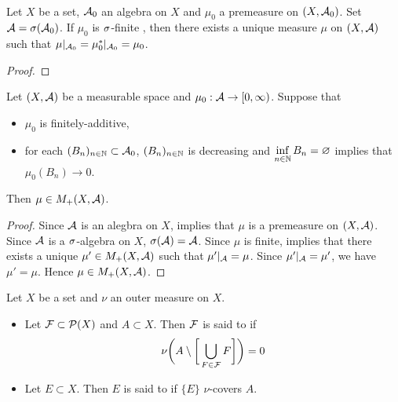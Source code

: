 \documentclass{book}
\begin{document}
	\begin{thm}   \\
		Let $X$ be a set, $\mathcal{A}_0$ an algebra on $X$ and $\mu_0$ a premeasure on $(X,\mathcal{A}_0)$. Set $\mathcal{A} = \sigma(\mathcal{A}_0)$. If $\mu_0$ is $\sigma$-finite , then there exists a unique measure $\mu$ on $(X, \mathcal{A})$ such that $\mu|_{\mathcal{A}_0} = \mu_0^*|_{\mathcal{A}_0} = \mu_0$. 
	\end{thm}

	\begin{proof}
	\end{proof}
	
	\begin{ex} 
		Let $(X, \mathcal{A})$ be a measurable space and $\mu_0:\mathcal{A} \rightarrow [0,\infty)$. Suppose that
		\begin{itemize}
			\item $\mu_0$ is finitely-additive,
			\item for each $(B_n)_{n \in \mathbb{N}} \subset \mathcal{A}_0$, $(B_n)_{n \in \mathbb{N}} $ is decreasing and $\inf\limits_{n \in \mathbb{N}} B_n = \varnothing$ implies that $\mu_0(B_n) \rightarrow 0$.
		\end{itemize}  
		Then $\mu \in M_+(X, \mathcal{A})$. 
	\end{ex}
	
	\begin{proof}
		Since $\mathcal{A}$ is an alegbra on $X$,  implies that $\mu$ is a premeasure on $(X, \mathcal{A})$. Since $\mathcal{A}$ is a $\sigma$-algebra on $X$, $\sigma(\mathcal{A}) = \mathcal{A}$. Since $\mu$ is finite,  implies that there exists a unique $\mu' \in M_+(X, \mathcal{A})$ such that $\mu'|_{\mathcal{A}} = \mu$. Since $\mu'|_{\mathcal{A}} = \mu'$, we have $\mu' = \mu$. Hence $\mu \in M_+(X, \mathcal{A})$.
	\end{proof}	
	
	\begin{defn}  
		Let $X$ be a set and $\nu$ an outer measure on $X$. 
		\begin{itemize}
			\item Let $\mathcal{F} \subset \mathcal{P}(X)$ and $A \subset X$. Then $\mathcal{F}$ is said to  if 
			$$\nu \bigg(A \setminus \bigg[ \bigcup_{F \in \mathcal{F}} F \bigg] \bigg) = 0$$
			\item Let $E \subset X$. Then $E$ is said to  if $\{E\}$ $\nu$-covers $A$.
		\end{itemize}
	\end{defn}
	
\end{document}
